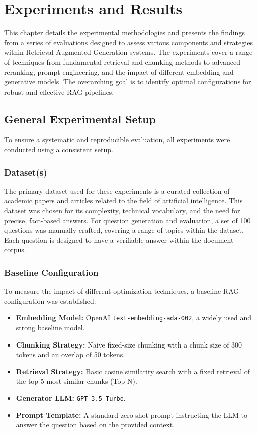 \chapter{Experiments and Results}
\label{chap:experiments_results}

This chapter details the experimental methodologies and presents the findings from a series of evaluations designed to assess various components and strategies within Retrieval-Augmented Generation systems. The experiments cover a range of techniques from fundamental retrieval and chunking methods to advanced reranking, prompt engineering, and the impact of different embedding and generative models. The overarching goal is to identify optimal configurations for robust and effective RAG pipelines.

\section{General Experimental Setup}
\label{sec:general_setup}
To ensure a systematic and reproducible evaluation, all experiments were conducted using a consistent setup.

\subsection{Dataset(s)}
The primary dataset used for these experiments is a curated collection of academic papers and articles related to the field of artificial intelligence. This dataset was chosen for its complexity, technical vocabulary, and the need for precise, fact-based answers. For question generation and evaluation, a set of 100 questions was manually crafted, covering a range of topics within the dataset. Each question is designed to have a verifiable answer within the document corpus.

\subsection{Baseline Configuration}
To measure the impact of different optimization techniques, a baseline RAG configuration was established:
\begin{itemize}
    \item \textbf{Embedding Model:} OpenAI \texttt{text-embedding-ada-002}, a widely used and strong baseline model.
    \item \textbf{Chunking Strategy:} Naive fixed-size chunking with a chunk size of 300 tokens and an overlap of 50 tokens.
    \item \textbf{Retrieval Strategy:} Basic cosine similarity search with a fixed retrieval of the top 5 most similar chunks (Top-N).
    \item \textbf{Generator LLM:} \texttt{GPT-3.5-Turbo}.
    \item \textbf{Prompt Template:} A standard zero-shot prompt instructing the LLM to answer the question based on the provided context.
\end{itemize}

